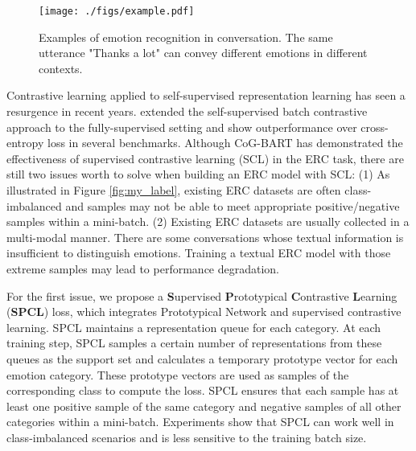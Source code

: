 \documentclass[11pt]{article}
\begin{document}
\begin{figure}
    \centering
    \texttt{[image: ./figs/example.pdf]}
    \caption{Examples of emotion recognition in conversation. The same utterance "Thanks a lot" can convey different emotions in different contexts.}
    \label{fig:example}
\end{figure}

Contrastive learning applied to self-supervised representation learning has seen a resurgence in recent years.  \citet{khosla2020supervised} extended the self-supervised batch contrastive approach to the fully-supervised setting and show outperformance over cross-entropy loss in several benchmarks. Although CoG-BART\cite{li2021contrast} has demonstrated the effectiveness of supervised contrastive learning (SCL) in the ERC task, there are still two issues worth to solve when building an ERC model with SCL: (1) As illustrated in Figure \ref{fig:my_label}, existing ERC datasets are often class-imbalanced and samples may not be able to meet appropriate positive/negative samples within a mini-batch. (2) Existing ERC datasets are usually collected in a multi-modal manner. There are some conversations whose textual information is insufficient to distinguish emotions. Training a textual ERC model with those extreme samples may lead to performance degradation.
 

For the first issue, we propose a \textbf{S}upervised \textbf{P}rototypical \textbf{C}ontrastive \textbf{L}earning (\textbf{SPCL}) loss, which integrates Prototypical Network\cite{snell2017prototypical} and supervised contrastive learning. SPCL maintains a representation queue for each category. At each training step, SPCL samples a certain number of representations from these queues as the support set and calculates a temporary prototype vector for each emotion category. These prototype vectors are used as samples of the corresponding class to compute the loss. SPCL ensures that each sample has at least one positive sample of the same category and negative samples of all other categories within a mini-batch. Experiments show that SPCL can work well in class-imbalanced scenarios and is less sensitive to the training batch size.
\end{document}
